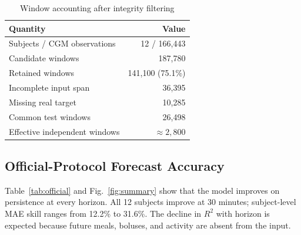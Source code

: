 \documentclass[journal]{IEEEtran}
\begin{document}
\begin{table}[t]
\centering
\caption{Window accounting after integrity filtering}
\label{tab:windows}
\footnotesize
\begin{tabular}{lr}
\toprule
Quantity & Value \\
\midrule
Subjects / CGM observations & 12 / 166,443 \\
Candidate windows & 187,780 \\
Retained windows & 141,100 (75.1\%) \\
Incomplete input span & 36,395 \\
Missing real target & 10,285 \\
Common test windows & 26,498 \\
Effective independent windows & $\approx 2{,}800$ \\
\bottomrule
\end{tabular}
\end{table}

\subsection{Official-Protocol Forecast Accuracy}

Table~\ref{tab:official} and Fig.~\ref{fig:summary} show that the model improves on persistence at every horizon. All 12 subjects improve at 30 minutes; subject-level MAE skill ranges from 12.2\% to 31.6\%. The decline in $R^2$ with horizon is expected because future meals, boluses, and activity are absent from the input.

\maetable
{}\rmsetable
{}\of\maetable \global\let\maePersA=\pgfplotsretval
{}\of\maetable \global\let\maePersB=\pgfplotsretval
{}\of\maetable \global\let\maePersC=\pgfplotsretval
{}\of\maetable \global\let\maePersD=\pgfplotsretval
{}\of\maetable \global\let\maeModA=\pgfplotsretval
{}\of\maetable \global\let\maeModB=\pgfplotsretval
{}\of\maetable \global\let\maeModC=\pgfplotsretval
{}\of\maetable \global\let\maeModD=\pgfplotsretval
{}\of\rmsetable \global\let\rmsePersA=\pgfplotsretval
{}\of\rmsetable \global\let\rmsePersB=\pgfplotsretval
{}\of\rmsetable \global\let\rmsePersC=\pgfplotsretval
{}\of\rmsetable \global\let\rmsePersD=\pgfplotsretval
{}\of\rmsetable \global\let\rmseModA=\pgfplotsretval
{}\of\rmsetable \global\let\rmseModB=\pgfplotsretval
{}\of\rmsetable \global\let\rmseModC=\pgfplotsretval
{}\of\rmsetable \global\let\rmseModD=\pgfplotsretval
\pgfmathsetmacro{\skillA}{100*(1-\rmseModA/\rmsePersA)}
\pgfmathsetmacro{\skillB}{100*(1-\rmseModB/\rmsePersB)}
\pgfmathsetmacro{\skillC}{100*(1-\rmseModC/\rmsePersC)}
\pgfmathsetmacro{\skillD}{100*(1-\rmseModD/\rmsePersD)}
\end{document}

